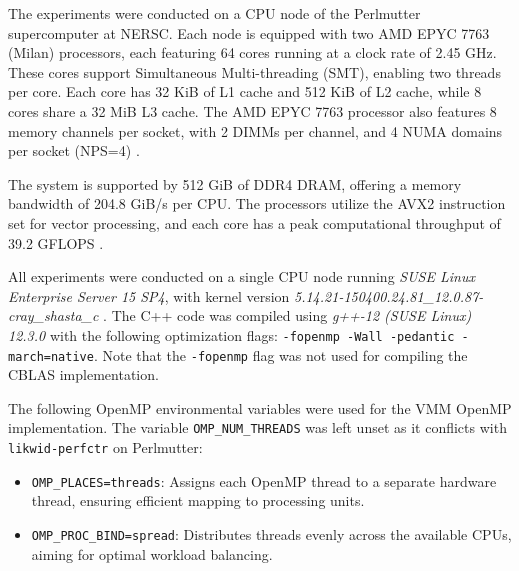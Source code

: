 


The experiments were conducted on a CPU node of the Perlmutter supercomputer at NERSC. Each node is equipped with two AMD EPYC 7763 (Milan) processors, each featuring 64 cores running at a clock rate of 2.45 GHz. These cores support Simultaneous Multi-threading (SMT), enabling two threads per core. Each core has 32 KiB of L1 cache and 512 KiB of L2 cache, while 8 cores share a 32 MiB L3 cache. The AMD EPYC 7763 processor also features 8 memory channels per socket, with 2 DIMMs per channel, and 4 NUMA domains per socket (NPS=4) \cite{amd_epyc_tuning_guide}.

The system is supported by 512 GiB of DDR4 DRAM, offering a memory bandwidth of 204.8 GiB/s per CPU. The processors utilize the AVX2 instruction set for vector processing, and each core has a peak computational throughput of 39.2 GFLOPS \cite{nersc_perlmutter_architecture}.

All experiments were conducted on a single CPU node running \textit{SUSE Linux Enterprise Server 15 SP4}, with kernel version \textit{5.14.21-150400.24.81\_12.0.87-cray\_shasta\_c} \cite{usami2024hostnamectl}. The C++ code was compiled using \textit{g++-12 (SUSE Linux) 12.3.0} with the following optimization flags: \texttt{-fopenmp -Wall -pedantic -march=native}. Note that the \texttt{-fopenmp} flag was not used for compiling the CBLAS implementation.

The following OpenMP environmental variables were used for the VMM OpenMP implementation. The variable \texttt{OMP\_NUM\_THREADS} was left unset as it conflicts with \texttt{likwid-perfctr} on Perlmutter:
\begin{itemize}
    \item \texttt{OMP\_PLACES=threads}: Assigns each OpenMP thread to a separate hardware thread, ensuring efficient mapping to processing units.
    \item \texttt{OMP\_PROC\_BIND=spread}: Distributes threads evenly across the available CPUs, aiming for optimal workload balancing.
\end{itemize}

